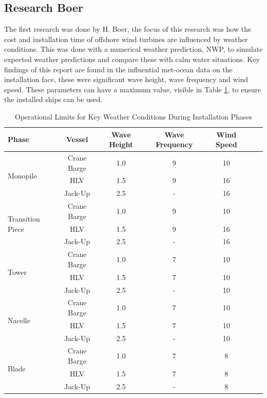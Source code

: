 \subsection{Research Boer}
The first research was done by H. Boer, the focus of this research was how the cost and installation time of offshore wind turbines are influenced by weather conditions. This was done with a numerical weather prediction, NWP, to simulate expected weather predictions and compare these with calm water situations. Key findings of this report are found in the influential met-ocean data on the installation face, these were significant wave height, wave frequency and wind speed. These parameters can have a maximum value, visible in Table \ref{table:operational_limits}, to ensure the installed ships can be used. 

\begin{table}[h!]
\centering
\caption{Operational Limits for Key Weather Conditions During Installation Phases}
\begin{tabular}{|l|c|c|c|c|c|c|}
\hline
\textbf{Phase} & \textbf{Vessel} & \textbf{Wave Height} & \textbf{Wave Frequency} & \textbf{Wind Speed} \\
\hline
\multirow{3}{*}{Monopile} & Crane Barge & 1.0 & 9 & 10 \\
 & HLV & 1.5 & 9 & 16 \\
 & Jack-Up & 2.5 & - & 16 \\
\hline
\multirow{3}{*}{Transition Piece} & Crane Barge & 1.0 & 9 & 10 \\
 & HLV & 1.5 & 9 & 16 \\
 & Jack-Up & 2.5 & - & 16 \\
\hline
\multirow{3}{*}{Tower} & Crane Barge & 1.0 & 7 & 10 \\
 & HLV & 1.5 & 7 & 10 \\
 & Jack-Up & 2.5 & - & 10 \\
\hline
\multirow{3}{*}{Nacelle} & Crane Barge & 1.0 & 7 & 10 \\
 & HLV & 1.5 & 7 & 10 \\
 & Jack-Up & 2.5 & - & 10 \\
\hline
\multirow{3}{*}{Blade} & Crane Barge & 1.0 & 7 & 8 \\
 & HLV & 1.5 & 7 & 8 \\
 & Jack-Up & 2.5 & - & 8 \\
\hline
\end{tabular}
\label{table:operational_limits}
\end{table}

